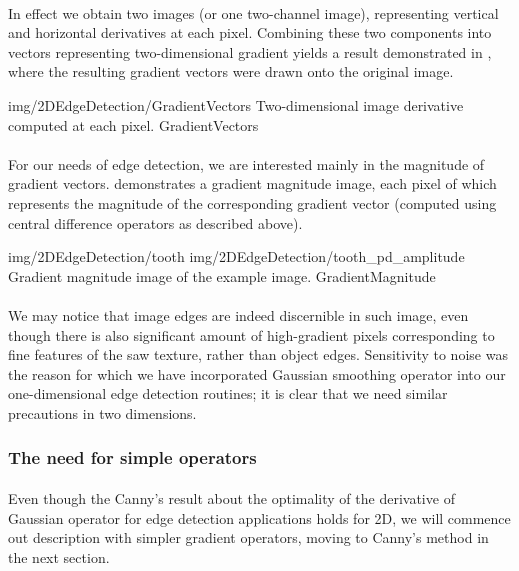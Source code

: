 \paragraph*{}
In effect we obtain two images (or one two-channel image), representing vertical and horizontal derivatives at each pixel. Combining these two components into vectors representing two-dimensional gradient yields a result demonstrated in , where the resulting gradient vectors were drawn onto the original image.

\oneFigure
{img/2DEdgeDetection/GradientVectors}
{Two-dimensional image derivative computed at each pixel.}
{GradientVectors}
{\basicWidth}

\paragraph*{}
For our needs of edge detection, we are interested mainly in the magnitude of gradient vectors.  demonstrates a gradient magnitude image, each pixel of which represents the magnitude of the corresponding gradient vector (computed using central difference operators as described above).

\twoFigures
{img/2DEdgeDetection/tooth}
{img/2DEdgeDetection/tooth_pd_amplitude}
{Gradient magnitude image of the example image.}
{GradientMagnitude}
{\basicWidth}

\paragraph*{}
We may notice that image edges are indeed discernible in such image, even though there is also significant amount of high-gradient pixels corresponding to fine features of the saw texture, rather than object edges. Sensitivity to noise was the reason for which we have incorporated Gaussian smoothing operator into our one-dimensional edge detection routines; it is clear that we need similar precautions in two dimensions.

\subsubsection{The need for simple operators}

\paragraph*{}
Even though the Canny's result\cite{Canny86} about the optimality of the derivative of Gaussian operator for edge detection applications holds for 2D, we will commence out description with simpler gradient operators, moving to Canny's method in the next section.

